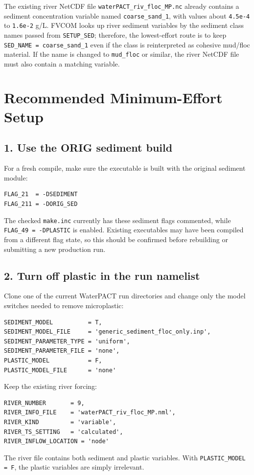 \documentclass[11pt]{article}
\begin{document}
The existing river NetCDF file \texttt{waterPACT\_riv\_floc\_MP.nc} already
contains a sediment concentration variable named \texttt{coarse\_sand\_1},
with values about \texttt{4.5e-4} to \texttt{1.6e-2} g/L.  FVCOM looks up
river sediment variables by the sediment class names passed from
\texttt{SETUP\_SED}; therefore, the lowest-effort route is to keep
\texttt{SED\_NAME = coarse\_sand\_1} even if the class is reinterpreted as
cohesive mud/floc material.  If the name is changed to \texttt{mud\_floc} or
similar, the river NetCDF file must also contain a matching variable.

\section*{Recommended Minimum-Effort Setup}

\subsection*{1. Use the ORIG sediment build}

For a fresh compile, make sure the executable is built with the original
sediment module:
\begin{verbatim}
FLAG_21  = -DSEDIMENT
FLAG_211 = -DORIG_SED
\end{verbatim}
The checked \texttt{make.inc} currently has these sediment flags commented,
while \texttt{FLAG\_49 = -DPLASTIC} is enabled.  Existing executables may have
been compiled from a different flag state, so this should be confirmed before
rebuilding or submitting a new production run.

\subsection*{2. Turn off plastic in the run namelist}

Clone one of the current WaterPACT run directories and change only the model
switches needed to remove microplastic:
\begin{verbatim}
SEDIMENT_MODEL          = T,
SEDIMENT_MODEL_FILE     = 'generic_sediment_floc_only.inp',
SEDIMENT_PARAMETER_TYPE = 'uniform',
SEDIMENT_PARAMETER_FILE = 'none',
PLASTIC_MODEL           = F,
PLASTIC_MODEL_FILE      = 'none'
\end{verbatim}

Keep the existing river forcing:
\begin{verbatim}
RIVER_NUMBER       = 9,
RIVER_INFO_FILE    = 'waterPACT_riv_floc_MP.nml',
RIVER_KIND         = 'variable',
RIVER_TS_SETTING   = 'calculated',
RIVER_INFLOW_LOCATION = 'node'
\end{verbatim}
The river file contains both sediment and plastic variables.  With
\texttt{PLASTIC\_MODEL = F}, the plastic variables are simply irrelevant.
\end{document}
